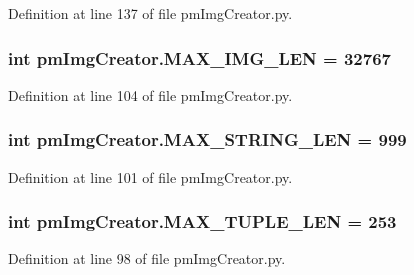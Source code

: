 Definition at line 137 of file pm\-Img\-Creator.\-py.

\hypertarget{namespacepm_img_creator_a18e02e76a25c5735b873101951926129}{
\subsubsection[{M\-A\-X\-\_\-\-I\-M\-G\-\_\-\-L\-E\-N}]{\setlength{\rightskip}{0pt plus 5cm}int pm\-Img\-Creator.\-M\-A\-X\-\_\-\-I\-M\-G\-\_\-\-L\-E\-N = 32767}}\label{namespacepm_img_creator_a18e02e76a25c5735b873101951926129}


Definition at line 104 of file pm\-Img\-Creator.\-py.

\hypertarget{namespacepm_img_creator_a11581bebd338ce4bed723cb0afddb514}{
\subsubsection[{M\-A\-X\-\_\-\-S\-T\-R\-I\-N\-G\-\_\-\-L\-E\-N}]{\setlength{\rightskip}{0pt plus 5cm}int pm\-Img\-Creator.\-M\-A\-X\-\_\-\-S\-T\-R\-I\-N\-G\-\_\-\-L\-E\-N = 999}}\label{namespacepm_img_creator_a11581bebd338ce4bed723cb0afddb514}


Definition at line 101 of file pm\-Img\-Creator.\-py.

\hypertarget{namespacepm_img_creator_aed732c838b0e5618e83b6d62cbcd0c0e}{
\subsubsection[{M\-A\-X\-\_\-\-T\-U\-P\-L\-E\-\_\-\-L\-E\-N}]{\setlength{\rightskip}{0pt plus 5cm}int pm\-Img\-Creator.\-M\-A\-X\-\_\-\-T\-U\-P\-L\-E\-\_\-\-L\-E\-N = 253}}\label{namespacepm_img_creator_aed732c838b0e5618e83b6d62cbcd0c0e}


Definition at line 98 of file pm\-Img\-Creator.\-py.


